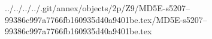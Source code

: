 ../../../../.git/annex/objects/2p/Z9/MD5E-s5207--99386c997a7766fb160935d40a9401be.tex/MD5E-s5207--99386c997a7766fb160935d40a9401be.tex